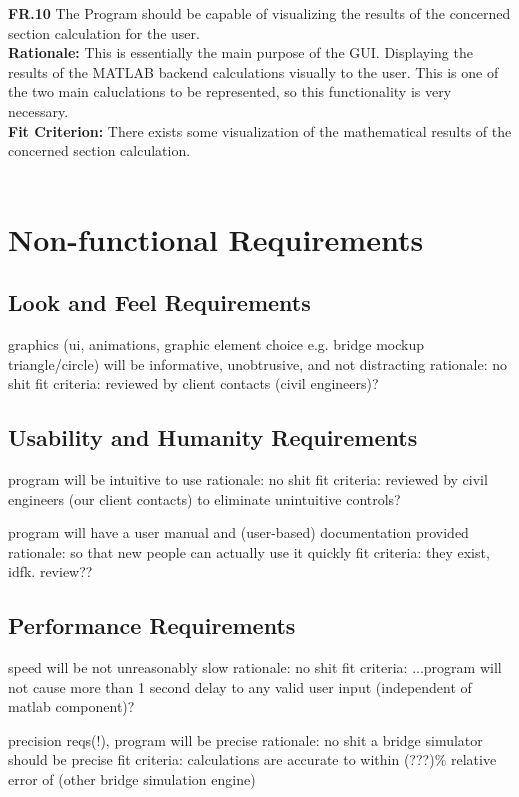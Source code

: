 \documentclass[12pt]{article}
\begin{document}
  \textbf{FR.10} The Program should be capable of visualizing the results of the concerned section calculation for the user.\\
  \textbf{Rationale:} This is essentially the main purpose of the GUI. Displaying the results of the MATLAB backend calculations visually to the user. This is one of the two
  main caluclations to be represented, so this functionality is very necessary.\\
  \textbf{Fit Criterion:} There exists some visualization of the mathematical results of the concerned section calculation.\\\\


\section{Non-functional Requirements}

\subsection{Look and Feel Requirements}

graphics (ui, animations, graphic element choice e.g. bridge mockup triangle/circle) will be informative, unobtrusive, and not distracting
rationale: no shit
fit criteria: reviewed by client contacts (civil engineers)?

\subsection{Usability and Humanity Requirements}

program will be intuitive to use
rationale: no shit
fit criteria: reviewed by civil engineers (our client contacts) to eliminate unintuitive controls?

program will have a user manual and (user-based) documentation provided
rationale: so that new people can actually use it quickly
fit criteria: they exist, idfk. review??

\subsection{Performance Requirements}

speed will be not unreasonably slow
rationale: no shit
fit criteria: ...program will not cause more than 1 second delay to any valid user input (independent of matlab component)?

precision reqs(!), program will be precise
rationale: no shit a bridge simulator should be precise
fit criteria: calculations are accurate to within (???)\% relative error of (other bridge simulation engine)
\end{document}
